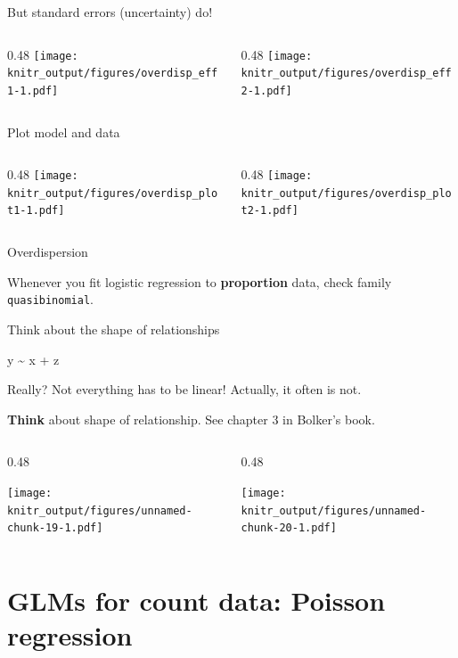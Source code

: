 \documentclass[10pt,ignorenonframetext,]{beamer}
\def\begincols{\begin{columns}[c]}
\def\endcols{\end{columns}}
\def\begincol{\begin{column}{0.48\textwidth}}
\def\endcol{\end{column}}
\begin{document}
\begin{frame}{But standard errors (uncertainty) do!}

\begincols
\begincol
\texttt{[image: knitr\_output/figures/overdisp\_eff1-1.pdf]} \endcol

\begincol
\texttt{[image: knitr\_output/figures/overdisp\_eff2-1.pdf]} \endcol
\endcols

\end{frame}

\begin{frame}{Plot model and data}

\begincols
\begincol
\texttt{[image: knitr\_output/figures/overdisp\_plot1-1.pdf]} \endcol

\begincol
\texttt{[image: knitr\_output/figures/overdisp\_plot2-1.pdf]} \endcol
\endcols

\end{frame}

\begin{frame}[fragile]{Overdispersion}

Whenever you fit logistic regression to \textbf{proportion} data, check
family \texttt{quasibinomial}.

\end{frame}

\begin{frame}{Think about the shape of relationships}

y \textasciitilde{} x + z

Really? Not everything has to be linear! Actually, it often is not.

\textbf{Think} about shape of relationship. See chapter 3 in Bolker's
book.

\begincols

\begincol

\texttt{[image: knitr\_output/figures/unnamed-chunk-19-1.pdf]}

\endcol

\begincol

\texttt{[image: knitr\_output/figures/unnamed-chunk-20-1.pdf]}

\endcol

\endcols

\end{frame}

\section{GLMs for count data: Poisson
regression}\label{glms-for-count-data-poisson-regression}
\end{document}
